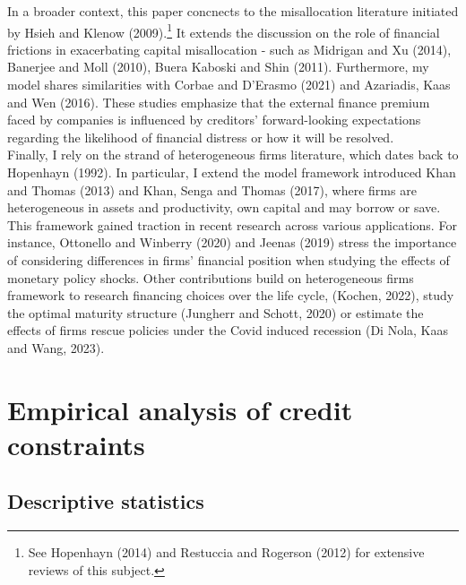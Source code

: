 \documentclass[12pt]{article}
\begin{document}
In a broader context, this paper concnects to the misallocation literature initiated by Hsieh and Klenow (2009).\footnote{See Hopenhayn (2014) and Restuccia and Rogerson (2012) for extensive reviews of this subject.} It extends the discussion on the role of financial frictions in exacerbating capital misallocation - such as Midrigan and Xu (2014), Banerjee and Moll (2010), Buera Kaboski and Shin (2011). Furthermore, my model shares similarities with Corbae and D'Erasmo (2021) and Azariadis, Kaas and Wen (2016). These studies emphasize that the external finance premium faced by companies is influenced by creditors' forward-looking expectations regarding the likelihood of financial distress or how it will be resolved. \vspace{3mm} \\
Finally, I rely on the strand of heterogeneous firms literature, which dates back to Hopenhayn (1992). In particular, I extend the model framework introduced Khan and Thomas (2013) and Khan, Senga and Thomas (2017), where firms are heterogeneous in assets and productivity, own capital and may borrow or save. This framework gained traction in recent research across various applications. For instance, Ottonello and Winberry (2020) and Jeenas (2019) stress the importance of considering differences in firms' financial position when studying the effects of monetary policy shocks. Other contributions build on heterogeneous firms framework to research financing choices over the life cycle, (Kochen, 2022), study the optimal maturity structure (Jungherr and Schott, 2020) or estimate the effects of firms rescue policies under the Covid induced recession (Di Nola, Kaas and Wang, 2023). 

\section{Empirical analysis of credit constraints \label{sec:quantitative analysis}}
\subsection{Descriptive statistics \label{sec:descriptive stats}}
\end{document}
